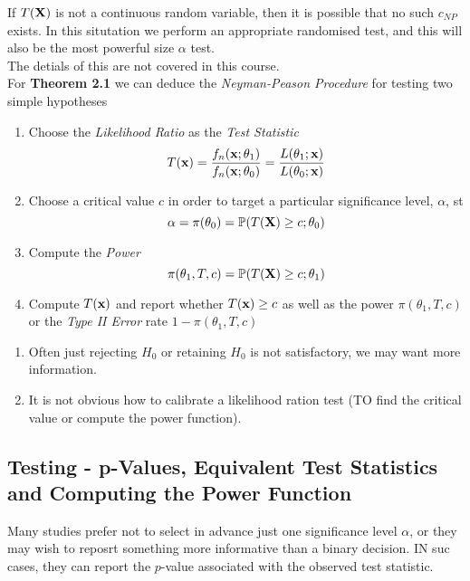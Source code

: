 \documentclass[11pt,a4paper]{article}
\begin{document}
If $T(\textbf{X})$ is not a continuous random variable, then it is possible that no such $c_{NP}$ exists. In this situtation we perform an appropriate randomised test, and this will also be the most powerful size $\alpha$ test. \\
\nb The detials of this are not covered in this course.\\

For \textbf{Theorem 2.1} we can deduce the \textit{Neyman-Peason Procedure} for testing two simple hypotheses
\begin{enumerate}[label=\roman*)]
	\item Choose the \textit{Likelihood Ratio} as the \textit{Test Statistic}
	$$T(\textbf{x})=\frac{f_n(\textbf{x};\theta_1)}{f_n(\textbf{x};\theta_0)}=\frac{L(\theta_1;\textbf{x})}{L(\theta_0;\textbf{x})}$$
	\item Choose a critical value $c$ in order to target a particular significance level, $\alpha$, st
	$$\alpha=\pi(\theta_0)=\mathbb{P}(T(\textbf{X})\geq c;\theta_0)$$
	\item Compute the \textit{Power}
	$$\pi(\theta_1,T,c)=\mathbb{P}(T(\textbf{X})\geq c;\theta_1)$$
	\item Compute $T(\textbf{x})$ and report whether $T(\textbf{x})\geq c$ as well as the power $\pi(\theta_1,T,c)$ or the \textit{Type II Error} rate $1-\pi(\theta_1,T,c)$
\end{enumerate}

\begin{enumerate}[label=\roman*)]
	\item Often just rejecting $H_0$ or retaining $H_0$ is not satisfactory, we may want more information.
	\item It is not obvious how to calibrate a likelihood ration test (\ie TO find the critical value or compute the power function).
\end{enumerate}

\subsection{Testing - p-Values, Equivalent Test Statistics and Computing the Power Function}

Many studies prefer not to select in advance just one significance level $\alpha$, or they may wish to reposrt something more informative than a binary decision. IN suc cases, they can report the $p$-value associated with the observed test statistic.\\
\end{document}

